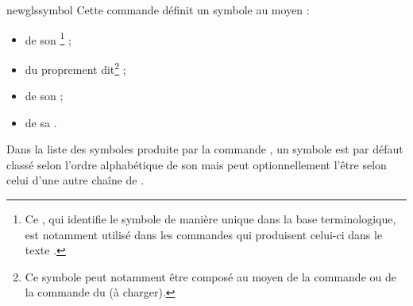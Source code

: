 
\begin{docCommand}{newglssymbol}{}
  Cette commande définit un symbole au moyen :
  \begin{itemize}
  \item de son \footnote{Ce , qui identifie le symbole de
      manière unique dans la base terminologique, est notamment utilisé dans
      les commandes qui produisent celui-ci dans le texte .} ;
\item du  proprement dit\footnote{Ce symbole peut notamment être
    composé au moyen de la commande  ou de la commande 
    du  (à charger).} ;
  \item de son  ;
  \item de sa .
  \end{itemize}
  Dans la liste des symboles produite par la commande , un
  symbole est par défaut classé selon l'ordre alphabétique de son 
  mais peut optionnellement l'être selon celui d'une autre chaîne de
  .
\end{docCommand}

